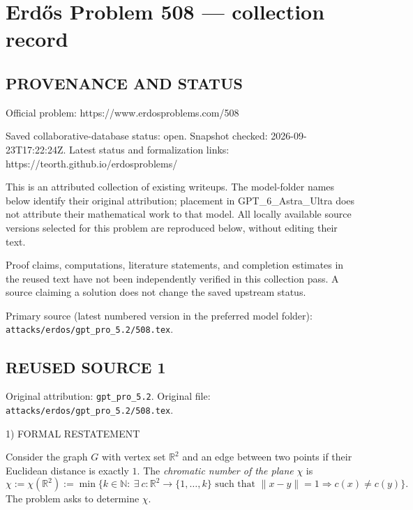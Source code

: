 \section*{Erd\H{o}s Problem 508 --- collection record}

\subsection*{PROVENANCE AND STATUS}
Official problem: https://www.erdosproblems.com/508

Saved collaborative-database status: open.
Snapshot checked: 2026-09-23T17:22:24Z.
Latest status and formalization links: https://teorth.github.io/erdosproblems/

This is an attributed collection of existing writeups. The model-folder names below identify their original attribution; placement in GPT\_6\_Astra\_Ultra does not attribute their mathematical work to that model. All locally available source versions selected for this problem are reproduced below, without editing their text.

Proof claims, computations, literature statements, and completion estimates in the reused text have not been independently verified in this collection pass. A source claiming a solution does not change the saved upstream status.

Primary source (latest numbered version in the preferred model folder): \texttt{attacks/erdos/gpt\_pro\_5.2/508.tex}.

\subsection*{REUSED SOURCE 1}
Original attribution: \texttt{gpt\_pro\_5.2}.
Original file: \texttt{attacks/erdos/gpt\_pro\_5.2/508.tex}.


1) FORMAL RESTATEMENT

Consider the graph $G$ with vertex set $\mathbb R^2$ and an edge between two points if their Euclidean distance is exactly $1$.
The \emph{chromatic number of the plane} $\chi$ is
\[
\chi := \chi(\mathbb R^2) := \min\big\{k\in\mathbb N:\ \exists\ c:\mathbb R^2\to\{1,\dots,k\}\text{ such that }\lVert x-y\rVert=1\Rightarrow c(x)\ne c(y)\big\}.
\]
The problem asks to determine $\chi$.

